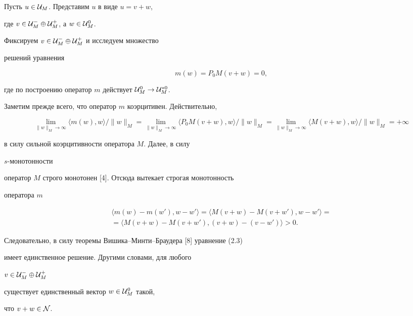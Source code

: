 \begin{pf}


Пусть $u\in{\cal U}_M$. Представим $u$ в виде $u=v+w$,


где $v\in{\cal U}_M^-\oplus{\cal U}_M^+$, а $w\in {\cal U}_M^0$.


Фиксируем $v\in{\cal U}_M^-\oplus{\cal U}_M^+$ и исследуем множество


решений уравнения


\begin{equation}


m(w) = P_0 M(v+w)=0,


\end{equation}


где по построению оператор $m$ действует ${\cal U}_M^0\to{\cal U}_M^{*0}$.


Заметим прежде всего, что оператор $m$ коэрцитивен. Действительно,


$$


\lim_{\|w\|_M\to \infty} \langle m(w), w\rangle / \|w\|_M =


\lim_{\|w\|_M\to \infty} \langle P_0 M(v+w), w\rangle / \|w\|_M =


\lim_{\|w\|_M\to \infty} \langle M(v+w), w\rangle / \|w\|_M = +\infty


$$


в силу сильной коэрцитивности оператора $M$. Далее, в силу


$s$-моно\-тон\-нос\-ти


оператор $M$ строго монотонен [4]. Отсюда вытекает строгая монотонность


оператора $m$


\begin{multline*}


\langle m(w) - m(w'), w-w'\rangle =


\langle M(v+w) - M(v+w'), w-w'\rangle = \\


=\langle M(v+w) - M(v+w'), (v+w) - (v-w')\rangle >0.


\end{multline*}


Следовательно, в силу теоремы Вишика--Минти--Браудера [8] уравнение (2.3)


имеет единственное решение. Другими словами, для любого


$v\in{\cal U}_M^-\oplus{\cal U}_M^+$


существует единственный вектор $w\in{\cal U}_M^0$ такой,


что $v+w\in {\cal N}$.






\end{pf}
